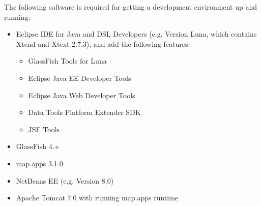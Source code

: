 
The following software is required for getting a development environment up and running:

\begin{itemize}
\item Eclipse IDE for Java and DSL Developers (e.g. Version Luna, which contains Xtend and Xtext 2.7.3), and add the following features:
\begin{itemize}
\item GlassFish Tools for Luna
\item Eclipse Java EE Developer Tools
\item Eclipse Java Web Developer Tools
\item Data Tools Platform Extender SDK
\item JSF Tools
\end{itemize}
\item GlassFish 4.+
\item map.apps 3.1.0
\item NetBeans EE (e.g. Version 8.0)
\item Apache Tomcat 7.0 with running map.apps runtime 
\end{itemize}





